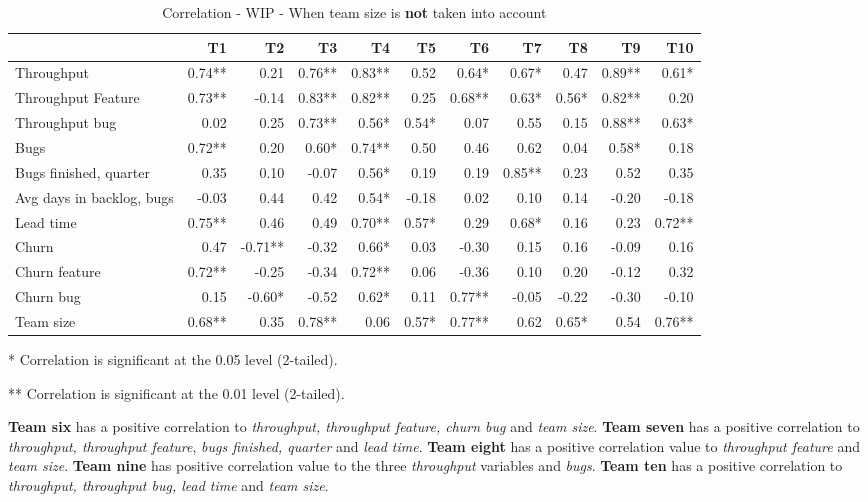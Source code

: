 \documentclass[UKenglish]{ifimaster}  %
\begin{document}
\begin{table}[H]
 \begin{adjustwidth}{-3cm}{}
 \centering
 \begin{tabular}{|l|r|r|r|r|r|r|r|r|r|r|}
\hline
 & \bf{T1} & \bf{T2} & \bf{T3} & \bf{T4} & \bf{T5} & \bf{T6} & \bf{T7} & \bf{T8} & \bf{T9} & \bf{T10}\\ \hline
 Throughput  & 0.74** & 0.21 & 0.76** & 0.83** & 0.52 & 0.64* & 0.67* & 0.47 & 0.89** & 0.61* \\ \hline
 Throughput Feature  & 0.73** & -0.14 & 0.83** & 0.82** & 0.25 & 0.68** & 0.63* & 0.56* & 0.82** & 0.20 \\ \hline
 Throughput bug  & 0.02 & 0.25 & 0.73** & 0.56* & 0.54* & 0.07 & 0.55 & 0.15 & 0.88** & 0.63* \\ \hline
 Bugs  & 0.72** & 0.20 & 0.60* & 0.74** & 0.50 & 0.46 & 0.62 & 0.04 & 0.58* & 0.18 \\ \hline
 Bugs finished, quarter  & 0.35 & 0.10 & -0.07 & 0.56* & 0.19 & 0.19 & 0.85** & 0.23 & 0.52 & 0.35 \\ \hline
 Avg days in backlog, bugs  & -0.03 & 0.44 & 0.42 & 0.54* & -0.18 & 0.02 & 0.10 & 0.14 & -0.20 & -0.18 \\ \hline
 Lead time  & 0.75** & 0.46 & 0.49 & 0.70** & 0.57* & 0.29 & 0.68* & 0.16 & 0.23 & 0.72** \\ \hline
 Churn  & 0.47 & -0.71** & -0.32 & 0.66* & 0.03 & -0.30 & 0.15 & 0.16 & -0.09 & 0.16 \\ \hline
 Churn feature  & 0.72** & -0.25 & -0.34 & 0.72** & 0.06 & -0.36 & 0.10 & 0.20 & -0.12 & 0.32 \\ \hline
 Churn bug  & 0.15 & -0.60* & -0.52 & 0.62* & 0.11 & 0.77** & -0.05 & -0.22 & -0.30 & -0.10 \\ \hline
 Team size  & 0.68** & 0.35 & 0.78** & 0.06 & 0.57* & 0.77** & 0.62 & 0.65* & 0.54 & 0.76**\\ \hline
\end{tabular}
 \caption{Correlation - WIP - When team size is \textbf{not} taken into account}
\label{corr:WIP}
 \centerline {* Correlation is significant at the 0.05 level (2-tailed).}
\centerline{** Correlation is significant at the 0.01 level (2-tailed).}
\end{adjustwidth}
\end{table}

\textbf{Team six} has a positive correlation to \textit{throughput, throughput feature, churn bug} and \textit{team size}. \textbf{Team seven} has a positive correlation to \textit{throughput, throughput feature}, \textit{bugs finished, quarter} and \textit{lead time}. \textbf{Team eight} has a positive correlation value to \textit{throughput feature} and \textit{team size}. \textbf{Team nine} has positive correlation value to the three \textit{throughput} variables and \textit{bugs}. \textbf{Team ten} has a positive correlation to \textit{throughput, throughput bug, lead time} and \textit{team size}. 
\end{document}
